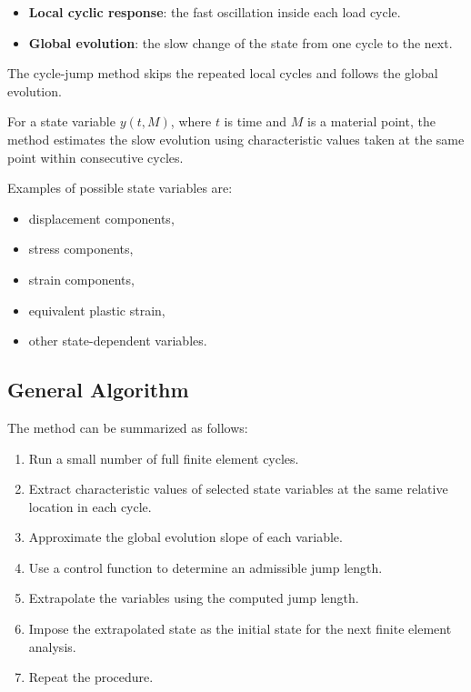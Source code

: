 ﻿\documentclass[11pt,a4paper]{article}
\begin{document}
\begin{itemize}[leftmargin=*]
    \item \textbf{Local cyclic response}: the fast oscillation inside each load cycle.
    \item \textbf{Global evolution}: the slow change of the state from one cycle to the next.
\end{itemize}

The cycle-jump method skips the repeated local cycles and follows the global evolution.

For a state variable $y(t,M)$, where $t$ is time and $M$ is a material point, the method estimates the slow evolution using characteristic values taken at the same point within consecutive cycles.

Examples of possible state variables are:

\begin{itemize}[leftmargin=*]
    \item displacement components,
    \item stress components,
    \item strain components,
    \item equivalent plastic strain,
    \item other state-dependent variables.
\end{itemize}

\subsection{General Algorithm}

The method can be summarized as follows:

\begin{enumerate}[leftmargin=*]
    \item Run a small number of full finite element cycles.
    \item Extract characteristic values of selected state variables at the same relative location in each cycle.
    \item Approximate the global evolution slope of each variable.
    \item Use a control function to determine an admissible jump length.
    \item Extrapolate the variables using the computed jump length.
    \item Impose the extrapolated state as the initial state for the next finite element analysis.
    \item Repeat the procedure.
\end{enumerate}
\end{document}
